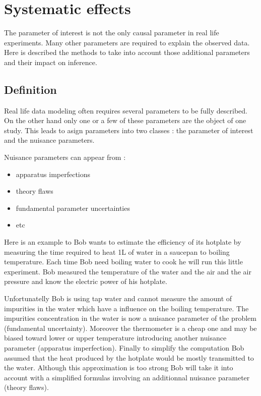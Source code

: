 







\section{Systematic effects} %
\label{sec:systematic_effects}


The parameter of interest is not the only causal parameter in real life experiments.
Many other parameters are required to explain the observed data.
Here is described the methods to take into account those additional parameters and their impact on inference. 





\subsection{Definition} %
\label{sub:definition}

Real life data modeling often requires several parameters to be fully described.
On the other hand only one or a few of these parameters are the object of one study.
This leads to asign parameters into two classes : the parameter of interest and the nuisance parameters.

Nuisance parameters can appear from :
\begin{itemize}
	\item apparatus imperfections
	\item theory flaws
	\item fundamental parameter uncertainties
	\item etc
\end{itemize}

Here is an example to 
Bob wants to estimate the efficiency of its hotplate by measuring the time required to heat 1L of water in a saucepan to boiling temperature.
Each time Bob need boiling water to cook he will run this little experiment.
Bob measured the temperature of the water and the air and the air pressure and know the electric power of his hotplate.

Unfortunatelly Bob is using tap water and cannot measure the amount of impurities in the water which have a influence on the boiling temperature.
The impurities concentration in the water is now a nuisance parameter of the problem (fundamental uncertainty).
Moreover the thermometer is a cheap one and may be biased toward lower or upper temperature introducing another nuisance parameter (apparatus imperfection).
Finally to simplify the computation Bob assumed that the heat produced by the hotplate would be mostly transmitted to the water.
Although this approximation is too strong Bob will take it into account with a simplified formulas involving an additionnal nuisance parameter (theory flaws).

